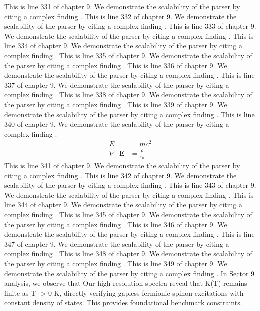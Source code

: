 This is line 331 of chapter 9. We demonstrate the scalability of the parser by citing a complex finding \cite{ref9_331}.
This is line 332 of chapter 9. We demonstrate the scalability of the parser by citing a complex finding \cite{ref9_332}.
This is line 333 of chapter 9. We demonstrate the scalability of the parser by citing a complex finding \cite{ref9_333}.
This is line 334 of chapter 9. We demonstrate the scalability of the parser by citing a complex finding \cite{ref9_334}.
This is line 335 of chapter 9. We demonstrate the scalability of the parser by citing a complex finding \cite{ref9_335}.
This is line 336 of chapter 9. We demonstrate the scalability of the parser by citing a complex finding \cite{ref9_336}.
This is line 337 of chapter 9. We demonstrate the scalability of the parser by citing a complex finding \cite{ref9_337}.
This is line 338 of chapter 9. We demonstrate the scalability of the parser by citing a complex finding \cite{ref9_338}.
This is line 339 of chapter 9. We demonstrate the scalability of the parser by citing a complex finding \cite{ref9_339}.
This is line 340 of chapter 9. We demonstrate the scalability of the parser by citing a complex finding \cite{ref9_340}.
\begin{align*}
  E &= mc^2 \\
  \nabla \cdot \mathbf{E} &= \frac{\rho}{\varepsilon_0}
\end{align*}
This is line 341 of chapter 9. We demonstrate the scalability of the parser by citing a complex finding \cite{ref9_341}.
This is line 342 of chapter 9. We demonstrate the scalability of the parser by citing a complex finding \cite{ref9_342}.
This is line 343 of chapter 9. We demonstrate the scalability of the parser by citing a complex finding \cite{ref9_343}.
This is line 344 of chapter 9. We demonstrate the scalability of the parser by citing a complex finding \cite{ref9_344}.
This is line 345 of chapter 9. We demonstrate the scalability of the parser by citing a complex finding \cite{ref9_345}.
This is line 346 of chapter 9. We demonstrate the scalability of the parser by citing a complex finding \cite{ref9_346}.
This is line 347 of chapter 9. We demonstrate the scalability of the parser by citing a complex finding \cite{ref9_347}.
This is line 348 of chapter 9. We demonstrate the scalability of the parser by citing a complex finding \cite{ref9_348}.
This is line 349 of chapter 9. We demonstrate the scalability of the parser by citing a complex finding \cite{ref9_349}.
In Sector 9 analysis, we observe that Our high-resolution spectra reveal that K(T) remains finite as T -> 0 K, directly verifying gapless fermionic spinon excitations with constant density of states. This provides foundational benchmark constraints.
